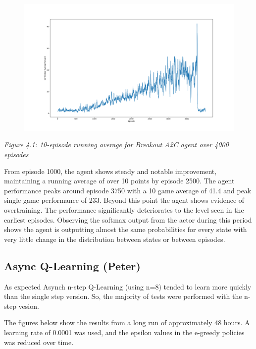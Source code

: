 \documentclass{article}
\begin{document}
\begin{figure}[h]
\includegraphics[scale=0.2]{A2C4000.png}
\end{figure}
\emph{Figure 4.1: 10-episode running average for Breakout A2C agent over 4000 episodes}

From episode 1000, the agent shows steady and notable improvement, maintaining a running average of over 10 points by episode 2500. The agent performance peaks around episode 3750 with a 10 game average of 41.4 and peak single game performance of 233. Beyond this point the agent shows evidence of overtraining. The performance significantly deteriorates to the level seen in the earliest episodes. Observing the softmax output from the actor during this period shows the agent is outputting almost the same probabilities for every state with very little change in the distribution between states or between episodes.

\subsection{Async Q-Learning (Peter)}

As expected Asynch n-step Q-Learning (using n=8) tended to learn more quickly than the single step version. So, the majority of tests were performed with the n-step vesion.

The figures below show the results from a long run of approximately 48 hours. A learning rate of 0.0001 was used, and the epsilon values in the e-greedy policies was reduced over time.
\end{document}
